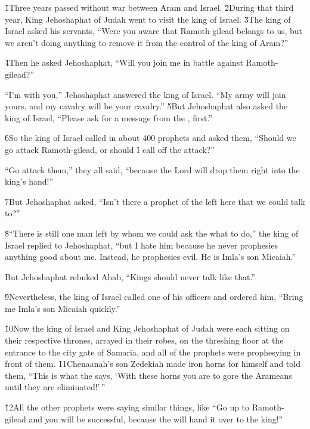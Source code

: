 \v{1}Three years passed without war between Aram and Israel. \v{2}During that third year, King Jehoshaphat of Judah went to visit the king of Israel. \v{3}The king of Israel asked his servants, ``Were you aware that Ramoth-gilead belongs to us, but we aren't doing anything to remove it from the control of the king of Aram?''

\v{4}Then he asked Jehoshaphat, ``Will you join me in battle against Ramoth-gilead?''

``I'm with you,'' Jehoshaphat answered the king of Israel. ``My army will join yours, and my cavalry will be your cavalry.'' \v{5}But Jehoshaphat also asked the king of Israel, ``Please ask for a message from the , first.''

\v{6}So the king of Israel called in about 400 prophets and asked them, ``Should we go attack Ramoth-gilead, or should I call off the attack?''

``Go attack them,'' they all said, ``because the Lord will drop them right into the king's hand!''

\v{7}But Jehoshaphat asked, ``Isn't there a prophet of the  left here that we could talk to?''

\v{8}``There is still one man left by whom we could ask the  what to do,'' the king of Israel replied to Jehoshaphat, ``but I hate him because he never prophesies anything good about me. Instead, he prophesies evil. He is Imla's son Micaiah.''

But Jehoshaphat rebuked Ahab, ``Kings should never talk like that.''

\v{9}Nevertheless, the king of Israel called one of his officers and ordered him, ``Bring me Imla's son Micaiah quickly.''

\v{10}Now the king of Israel and King Jehoshaphat of Judah were each sitting on their respective thrones, arrayed in their robes, on the threshing floor at the entrance to the city gate of Samaria, and all of the prophets were prophesying in front of them. \v{11}Chenaanah's son Zedekiah made iron horns for himself and told them, ``This is what the  says, `With these horns you are to gore the Arameans until they are eliminated!'\,''

\v{12}All the other prophets were saying similar things, like ``Go up to Ramoth-gilead and you will be successful, because the  will hand it over to the king!''

